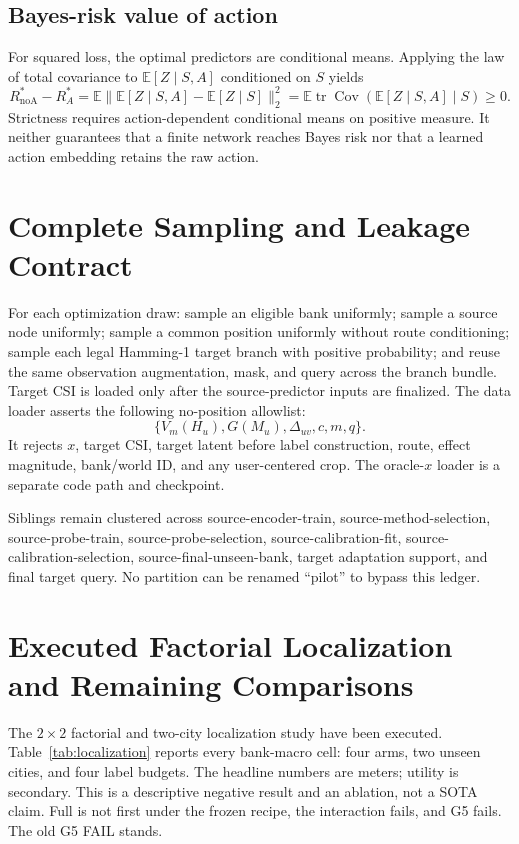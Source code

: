 \documentclass{article}
\newcommand{\csi}{H}
\newcommand{\map}{M}
\newcommand{\E}{\mathbb{E}}
\begin{document}
\subsection{Bayes-risk value of action}
For squared loss, the optimal predictors are conditional means.  Applying the
law of total covariance to $\E[Z\mid S,A]$ conditioned on $S$ yields
\begin{equation*}
 R_{\mathrm{noA}}^*-R_A^*
 =\E\|\E[Z\mid S,A]-\E[Z\mid S]\|_2^2
 =\E\operatorname{tr}\operatorname{Cov}(\E[Z\mid S,A]\mid S)\ge0.
\end{equation*}
Strictness requires action-dependent conditional means on positive measure.
It neither guarantees that a finite network reaches Bayes risk nor that a
learned action embedding retains the raw action.

\section{Complete Sampling and Leakage Contract}

For each optimization draw: sample an eligible bank uniformly; sample a source
node uniformly; sample a common position uniformly without route conditioning;
sample each legal Hamming-1 target branch with positive probability; and reuse
the same observation augmentation, mask, and query across the branch bundle.
Target CSI is loaded only after the source-predictor inputs are finalized.  The
data loader asserts the following no-position allowlist:
\begin{equation*}
\{V_m(\csi_u),G(\map_u),\Delta_{uv},c,m,q\}.
\end{equation*}
It rejects $x$, target CSI, target latent before label construction, route,
effect magnitude, bank/world ID, and any user-centered crop.  The oracle-$x$
loader is a separate code path and checkpoint.

Siblings remain clustered across source-encoder-train, source-method-selection,
source-probe-train, source-probe-selection, source-calibration-fit,
source-calibration-selection, source-final-unseen-bank, target adaptation
support, and final target query.  No partition can be
renamed ``pilot'' to bypass this ledger.

\section{Executed Factorial Localization and Remaining Comparisons}

The $2\times2$ factorial and two-city localization study have been executed.
Table~\ref{tab:localization} reports every bank-macro cell: four arms, two
unseen cities, and four label budgets.  The headline numbers are meters;
utility is secondary.  This is a descriptive negative result and an
ablation, not a SOTA claim.  Full is not first under the frozen recipe,
the interaction fails, and G5 fails.  The old G5 FAIL stands.
\end{document}
